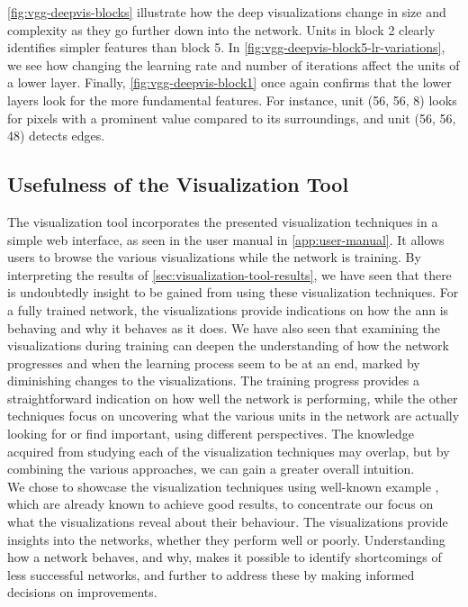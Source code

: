 \noindent \autoref{fig:vgg-deepvis-blocks} illustrate how the deep visualizations change in size and complexity as they go further down into the network. Units in block 2 clearly identifies simpler features than block 5. In \autoref{fig:vgg-deepvis-block5-lr-variations}, we see how changing the learning rate and number of iterations affect the units of a lower layer. Finally, \autoref{fig:vgg-deepvis-block1} once again confirms that the lower layers look for the more fundamental features. For instance, unit (56, 56, 8) looks for pixels with a prominent value compared to its surroundings, and unit (56, 56, 48) detects edges.

\subsection{Usefulness of the Visualization Tool}

The visualization tool incorporates the presented visualization techniques in a simple web interface, as seen in the user manual in \autoref{app:user-manual}. It allows users to browse the various visualizations while the network is training. By interpreting the results of \autoref{sec:visualization-tool-results}, we have seen that there is undoubtedly insight to be gained from using these visualization techniques. For a fully trained network, the visualizations provide indications on how the \acrshort{ann} is behaving and why it behaves as it does. We have also seen that examining the visualizations during training can deepen the understanding of how the network progresses and when the learning process seem to be at an end, marked by diminishing changes to the visualizations. The training progress provides a straightforward indication on how well the network is performing, while the other techniques focus on uncovering what the various units in the network are actually looking for or find important, using different perspectives. The knowledge acquired from studying each of the visualization techniques may overlap, but by combining the various approaches, we can gain a greater overall intuition. \\

\noindent We chose to showcase the visualization techniques using well-known example , which are already known to achieve good results, to concentrate our focus on what the visualizations reveal about their behaviour. The visualizations provide insights into the networks, whether they perform well or poorly. Understanding how a network behaves, and why, makes it possible to identify shortcomings of less successful networks, and further to address these by making informed decisions on improvements. \\


